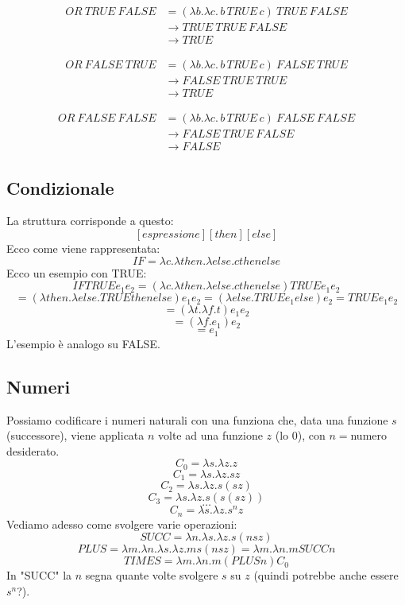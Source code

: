 \documentclass[12pt,a4paper]{article}
\begin{document}
\[
\begin{aligned}
OR\ TRUE\ FALSE
&= (\lambda b.\lambda c.\,b\,TRUE\,c)\ TRUE\ FALSE\\
&\rightarrow TRUE\ TRUE\ FALSE\\
&\rightarrow TRUE
\end{aligned}
\]

\[
\begin{aligned}
OR\ FALSE\ TRUE
&= (\lambda b.\lambda c.\,b\,TRUE\,c)\ FALSE\ TRUE\\
&\rightarrow FALSE\ TRUE\ TRUE\\
&\rightarrow TRUE
\end{aligned}
\]

\[
\begin{aligned}
OR\ FALSE\ FALSE
&= (\lambda b.\lambda c.\,b\,TRUE\,c)\ FALSE\ FALSE\\
&\rightarrow FALSE\ TRUE\ FALSE\\
&\rightarrow FALSE
\end{aligned}
\]

\subsection{Condizionale}
La struttura corrisponde a questo:
\[
[espressione][then][else]
\]
Ecco come viene rappresentata:
\[
IF = \lambda c.\lambda then.\lambda else.c then else
\]
Ecco un esempio con TRUE:
\[
IF TRUE e_1 e_2 = (\lambda c.\lambda then.\lambda else.c then else) TRUE e_1 e_2
\]
\[
= (\lambda then.\lambda else.TRUE then else)e_1 e_2 = (\lambda else.TRUE e_1 else)e_2 = TRUE e_1 e_2
\]
\[
= (\lambda t.\lambda f.t)e_1 e_2
\]
\[
= (\lambda f.e_1)e_2
\]
\[
= e_1
\]
L'esempio è analogo su FALSE.

\subsection{Numeri}
Possiamo codificare i numeri naturali con una funziona che, data una funzione $s$ (successore), viene applicata $n$ volte ad una funzione $z$ (lo 0), con $n = $numero desiderato.
\[
C_0 = \lambda s.\lambda z.z
\]
\[
C_1 = \lambda s.\lambda z.sz
\]
\[
C_2 = \lambda s.\lambda z.s(sz)
\]
\[
C_3 = \lambda s.\lambda z.s(s(sz))
\]
\[
\dots
\]
\[
C_n = \lambda s.\lambda z.s^n z
\]
Vediamo adesso come svolgere varie operazioni:
\[
SUCC = \lambda n.\lambda s.\lambda z.s(nsz)
\]
\[
PLUS = \lambda m.\lambda n.\lambda s.\lambda z.m s(nsz) = \lambda m.\lambda n.m SUCC n
\]
\[
TIMES = \lambda m.\lambda n.m(PLUS n)C_0
\]
In "SUCC" la $n$ segna quante volte svolgere $s$ su $z$ (quindi potrebbe anche essere $s^n$?).
\end{document}
